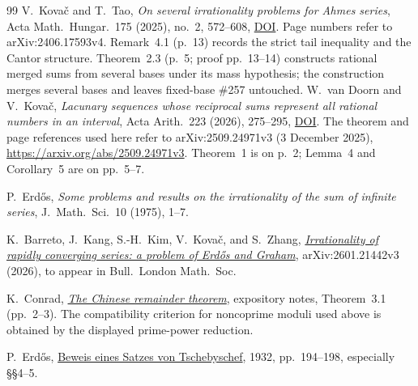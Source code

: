\documentclass[11pt]{article}
\theoremstyle{plain}
\theoremstyle{definition}
\theoremstyle{remark}
\begin{document}
\begin{thebibliography}{99}
 V.~Kova\v{c} and T.~Tao, \emph{On several irrationality
  problems for Ahmes series}, Acta Math.\ Hungar.\ 175 (2025), no.~2, 572--608,
  \href{https://doi.org/10.1007/s10474-025-01528-0}{DOI}.  Page numbers refer
  to arXiv:2406.17593v4.  Remark~4.1 (p.~13) records the strict tail
  inequality and the Cantor structure.  Theorem~2.3 (p.~5; proof pp.~13--14)
  constructs rational merged sums from several bases under its mass
  hypothesis; the construction merges several bases and leaves fixed-base \#257 untouched.
 W.~van Doorn and V.~Kova\v{c},
  \emph{Lacunary sequences whose reciprocal sums represent all rational
  numbers in an interval}, Acta Arith.\ 223 (2026), 275--295,
  \href{https://doi.org/10.4064/aa251001-13-1}{DOI}.
  The theorem and page references used here refer to
  arXiv:2509.24971v3 (3 December 2025),
  \url{https://arxiv.org/abs/2509.24971v3}.
  Theorem~1 is on p.~2; Lemma~4 and Corollary~5 are on pp.~5--7.

 P.~Erd\H{o}s, \emph{Some problems and results on the
  irrationality of the sum of infinite series}, J.~Math.\ Sci.\ 10 (1975),
  1--7.

 K.~Barreto, J.~Kang, S.-H.~Kim, V.~Kova\v{c}, and
  S.~Zhang, \href{https://arxiv.org/abs/2601.21442v3}{\emph{Irrationality of
  rapidly converging series: a problem of Erd\H{o}s and Graham}},
  arXiv:2601.21442v3 (2026), to appear in Bull.\ London Math.\ Soc.

 K.~Conrad,
  \href{https://kconrad.math.uconn.edu/blurbs/ugradnumthy/crt.pdf}
  {\emph{The Chinese remainder theorem}}, expository notes,
  Theorem~3.1 (pp.~2--3).  The compatibility criterion for noncoprime
  moduli used above is obtained by the displayed prime-power reduction.

 P.~Erd\H{o}s,
  \href{https://www.renyi.hu/~p_erdos/1932-01.pdf}
  {Beweis eines Satzes von Tschebyschef}, 1932, pp.~194--198,
  especially \S\S4--5.

\end{thebibliography}
\end{document}
